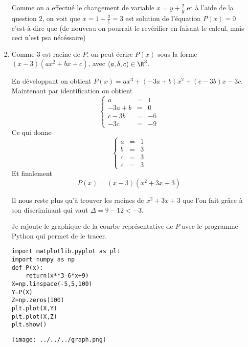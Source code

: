 \documentclass[a4paper, 11pt,reqno]{article}
\begin{document}
\begin{correction}
\begin{enumerate}
Comme  on a effectué le changement de variable  $x=y+\frac{2}{y}$ et à l'aide de la question $2$, on voit que $x=1+\frac{2}{1}=3$ est solution de l'équation $P(x)=0$ c'est-à-dire que 
 (de nouveau on pourrait le revérifier en faisant le calcul, mais ceci n'est psa nécéssaire)

\item Comme $3$ est racine de $P$, on peut écrire $P(x)$ sous la forme $(x-3)(ax^2+bx+c)$, avec $(a,b,c)\in \R^3$. 

En développant on obtient 
$P(x)= ax^3 +(-3a+b)x^2+(c-3b)x-3c.$ Maintenant par identification on obtient 
$$\left\{\begin{array}{ccc}
a&=&1\\
-3a+b&=&0\\
c-3b&=&-6\\
-3c&=&-9
\end{array}\right.$$
Ce qui donne 
$$\left\{\begin{array}{ccc}
a&=&1\\
b&=&3\\
c&=&3\\
c&=&3
\end{array}\right.$$
Et finalement 
$$P(x) = (x-3) (x^2+3x+3)$$

Il nous reste plus qu'à trouver les racines de $x^2+3x+3$ que l'on fait grâce à son discriminant qui vaut $\Delta =9-12<-3$. 



Je rajoute le graphique de la courbe représentative de $P$ avec le programme Python qui permet de le tracer. 
\begin{lstlisting}
import matplotlib.pyplot as plt
import numpy as np
def P(x):
    return(x**3-6*x+9)
X=np.linspace(-5,5,100)
Y=P(X)
Z=np.zeros(100)
plt.plot(X,Y)
plt.plot(X,Z)
plt.show()
\end{lstlisting}
\begin{center}
\texttt{[image: ../../../graph.png]} 
\end{center}

 
\end{enumerate}

\end{correction}
\end{document}
